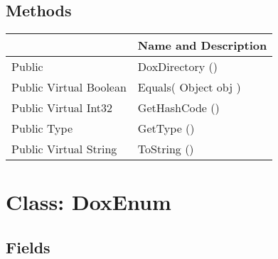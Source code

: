 \documentclass[11pt, oneside, a4paper]{book}
\begin{document}
\subsection{Methods}
\begin{center}
\begin{tabular}{| p{3cm} | p{12cm} | }
\hline
\textbf{ } & \textbf{ Name and Description}\\
\hline
 Public  &  DoxDirectory ()\hypertarget{SoftwareEngineeringTools.{}Documentation.{}DoxDirectory.{}DoxDirectory}{}\\
\hline
 Public  Virtual  Boolean &  Equals(\hypertarget{SoftwareEngineeringTools.{}Documentation.{}DoxDirectory.{}Equals\_Object}{} Object  obj  )\\
\hline
 Public  Virtual  Int32 &  GetHashCode ()\hypertarget{SoftwareEngineeringTools.{}Documentation.{}DoxDirectory.{}GetHashCode}{}\\
\hline
 Public  Type &  GetType ()\hypertarget{SoftwareEngineeringTools.{}Documentation.{}DoxDirectory.{}GetType}{}\\
\hline
 Public  Virtual  String &  ToString ()\hypertarget{SoftwareEngineeringTools.{}Documentation.{}DoxDirectory.{}ToString}{}\\
\hline
\end{tabular}
\end{center}
 


\hypertarget{SoftwareEngineeringTools.{}Documentation.{}DoxEnum}{}
\section{Class: DoxEnum}

\subsection{Fields}
\end{document}
